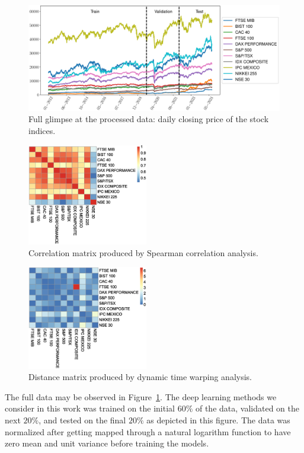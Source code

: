 \begin{figure}
    \centering
    \includegraphics[width=1.0\textwidth]{./figures/alldata.eps}
    \caption{Full glimpse at the processed data: daily closing price of the stock indices.}
    \label{fig:alldata}
\end{figure}

\begin{figure}[tbh]
  \includegraphics[width=0.47\textwidth]{./figures/cor2.eps}
  \caption{Correlation matrix produced by Spearman correlation analysis.} 
  \label{fig:cor2}
\end{figure}

\begin{figure}[tbh]
  \includegraphics[width=0.47\textwidth]{./figures/dist2.eps}
  \caption{Distance matrix produced by dynamic time warping analysis.} 
  \label{fig:dist2}
\end{figure}

The full data may be observed in Figure~\ref{fig:alldata}. The deep learning 
methods we consider in this work was trained on the initial $60\%$ of the data, 
validated on the next $20\%$, and tested on the final $20\%$ as depicted in this
figure. The data was normalized after getting mapped through a natural logarithm
function to have zero mean and unit variance before training the models.
